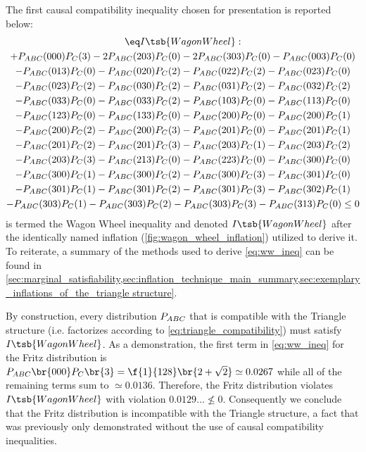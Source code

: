 \documentclass[aps, 10pt, english, twoside, pra, nofootinbib, tightenlines, longbibliography, superscriptaddress]{revtex4-1}
\begin{document}
    The first causal compatibility inequality chosen for presentation is reported below:
    \begin{equation*}
    \begin{gathered}
    \eq\label{eq:ww_ineq}
    I\tsb{WagonWheel} : \\
    + P_{ABC}(000)P_{C}(3) - 2P_{ABC}(203)P_{C}(0) - 2P_{ABC}(303)P_{C}(0) - P_{ABC}(003)P_{C}(0) \\
    - P_{ABC}(013)P_{C}(0) - P_{ABC}(020)P_{C}(2) - P_{ABC}(022)P_{C}(2) - P_{ABC}(023)P_{C}(0) \\
    - P_{ABC}(023)P_{C}(2) - P_{ABC}(030)P_{C}(2) - P_{ABC}(031)P_{C}(2) - P_{ABC}(032)P_{C}(2) \\
    - P_{ABC}(033)P_{C}(0) - P_{ABC}(033)P_{C}(2) - P_{ABC}(103)P_{C}(0) - P_{ABC}(113)P_{C}(0) \\
    - P_{ABC}(123)P_{C}(0) - P_{ABC}(133)P_{C}(0) - P_{ABC}(200)P_{C}(0) - P_{ABC}(200)P_{C}(1) \\
    - P_{ABC}(200)P_{C}(2) - P_{ABC}(200)P_{C}(3) - P_{ABC}(201)P_{C}(0) - P_{ABC}(201)P_{C}(1) \\
    - P_{ABC}(201)P_{C}(2) - P_{ABC}(201)P_{C}(3) - P_{ABC}(203)P_{C}(1) - P_{ABC}(203)P_{C}(2) \\
    - P_{ABC}(203)P_{C}(3) - P_{ABC}(213)P_{C}(0) - P_{ABC}(223)P_{C}(0) - P_{ABC}(300)P_{C}(0) \\
    - P_{ABC}(300)P_{C}(1) - P_{ABC}(300)P_{C}(2) - P_{ABC}(300)P_{C}(3) - P_{ABC}(301)P_{C}(0) \\
    - P_{ABC}(301)P_{C}(1) - P_{ABC}(301)P_{C}(2) - P_{ABC}(301)P_{C}(3) - P_{ABC}(302)P_{C}(1) \\
    - P_{ABC}(303)P_{C}(1) - P_{ABC}(303)P_{C}(2) - P_{ABC}(303)P_{C}(3) - P_{ABC}(313)P_{C}(0) \leq 0
    \end{gathered}
    \end{equation*}
     is termed the Wagon Wheel inequality and denoted $I\tsb{WagonWheel}$ after the identically named inflation (\cref{fig:wagon_wheel_inflation}) utilized to derive it. To reiterate, a summary of the methods used to derive \cref{eq:ww_ineq} can be found in \cref{sec:marginal_satisfiability,sec:inflation_technique_main_summary,sec:exemplary_inflations_of_the_triangle structure}.

    By construction, every distribution $\prob[ABC]$ that is compatible with the Triangle structure (i.e. factorizes according to \cref{eq:triangle_compatibility}) must satisfy $I\tsb{WagonWheel}$. As a demonstration, the first term in \cref{eq:ww_ineq} for the Fritz distribution is $\prob[ABC]\br{000}\prob[C]\br{3} = \f{1}{128}\br{2 + \sqrt{2}} \simeq 0.0267$ while all of the remaining terms sum to $\simeq 0.0136$. Therefore, the Fritz distribution violates $I\tsb{WagonWheel}$ with violation $0.0129\ldots \not \leq 0$. Consequently we conclude that the Fritz distribution is incompatible with the Triangle structure, a fact that was previously only demonstrated without the use of causal compatibility inequalities.
\end{document}
